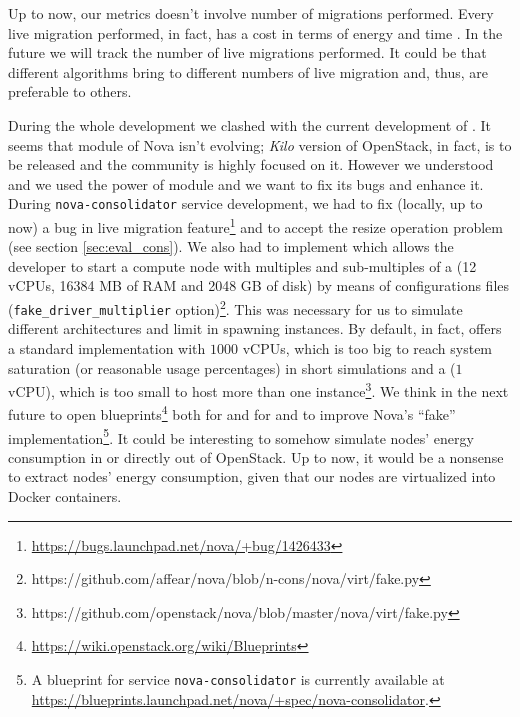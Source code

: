 Up to now, our metrics doesn't involve number of migrations performed. Every live migration performed, in fact, has a cost in terms of energy and time . In the future we will track the number of live migrations performed. It could be that different algorithms bring to different numbers of live migration and, thus, are preferable to others.

During the whole development we clashed with the current development of . It seems that  module of Nova isn't evolving; \emph{Kilo} version of OpenStack, in fact, is to be released and the community is highly focused on it. However we understood and we used the power of  module and we want to fix its bugs and enhance it. During \texttt{nova-consolidator} service development, we had to fix (locally, up to now) a bug in live migration feature\footnote{\url{https://bugs.launchpad.net/nova/+bug/1426433}} and to accept the resize operation problem (see section \ref{sec:eval_cons}). We also had to implement  which allows the developer to start a compute node with multiples and sub-multiples of a  (12 vCPUs, 16384 MB of RAM and 2048 GB of disk) by means of configurations files (\texttt{fake\_driver\_multiplier} option)\footnote{https://github.com/affear/nova/blob/n-cons/nova/virt/fake.py}. This was necessary for us to simulate different architectures and limit in spawning instances. By default, in fact,  offers a standard implementation with $1000$ vCPUs, which is too big to reach system saturation (or reasonable usage percentages) in short simulations and a  ($1$ vCPU), which is too small to host more than one instance\footnote{https://github.com/openstack/nova/blob/master/nova/virt/fake.py}. We think in the next future to open blueprints\footnote{\url{https://wiki.openstack.org/wiki/Blueprints}} both for  and for  and to improve Nova's ``fake'' implementation\footnote{A blueprint for service \texttt{nova-consolidator} is currently available at \url{https://blueprints.launchpad.net/nova/+spec/nova-consolidator}.}. It could be interesting to somehow simulate nodes' energy consumption in  or directly out of OpenStack. Up to now, it would be a nonsense to extract nodes' energy consumption, given that our nodes are virtualized into Docker containers.


